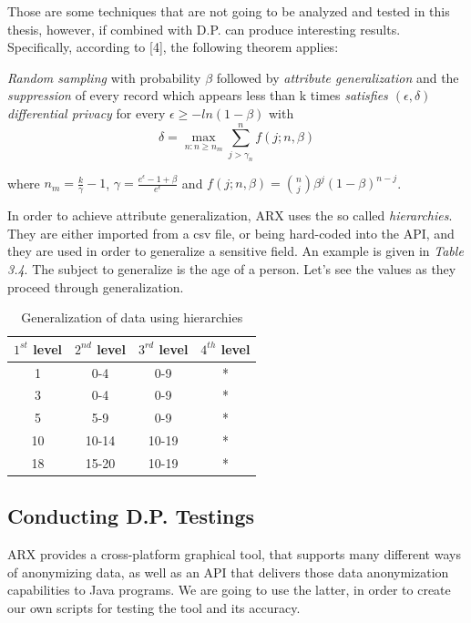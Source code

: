 Those are some techniques that are not going to be analyzed and tested in this thesis, however, if combined with D.P. can produce interesting results. Specifically, according to [4], the following theorem applies:

\emph{Random sampling} with probability $\beta$ followed by \emph{attribute generalization} and the \emph{suppression} of
every record which appears less than k times \emph{satisfies $(\epsilon, \delta)$ differential privacy} for every $\epsilon \geq -ln(1-\beta)$ with 
$$\delta = \max_{n:n \geq n_m} \sum_{j>\gamma_n}^{n}f(j;n,\beta)$$

where $n_m = \frac{k}{\gamma} - 1$, $\gamma = \frac{e^\epsilon-1+\beta}{e^\epsilon}$ and $f(j;n,\beta) = {n \choose  j} \beta^j(1-\beta)^{n-j}$.

In order to achieve attribute generalization, ARX uses the so called \emph{hierarchies}. They are either imported from a csv file, or being hard-coded into the API, and they are used in order to generalize a sensitive field. An example is given in \emph{Table 3.4}. The subject to generalize is the age of a person. Let's see the values as they proceed through generalization.

\begin{table}[!htb]
    \centering

    \caption{Generalization of data using hierarchies}
    \label{numbers}

    \begin{tabular}{| c | c | c | c |}
      \hline 
      $1^{st}$ level & $2^{nd}$ level & $3^{rd}$ level & $4^{th}$ level\\
      \hline
      1 & 0-4 & 0-9 & *\\
      \hline
      3 & 0-4 & 0-9 & *\\
      \hline
      5 & 5-9 & 0-9 & * \\
      \hline
      10 & 10-14 & 10-19 & *\\
      \hline
      18 & 15-20 & 10-19 & *\\
      \hline
    
    \end{tabular}
\end{table}

\subsection{Conducting D.P. Testings}

ARX provides a cross-platform graphical tool, that supports many different ways of anonymizing data, as well as an API that delivers those data anonymization capabilities to Java programs. We are going to use the latter, in order to create our own scripts for testing the tool and its accuracy.

